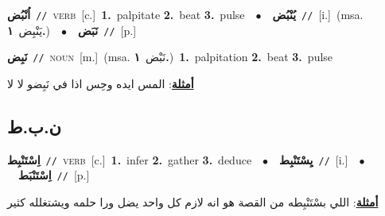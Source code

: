 \documentclass[10pt,a4paper,twoside]{article} %
\begin{document}
\begin{multicols}{2}
{{{{{\setlength\topsep{0pt}\textbf{\foreignlanguage{arabic}{اُنْبُض}}\ {\color{gray}\texttt{//}\color{black}}\ \textsc{verb}\ [c.]\ \textbf{1.}~palpitate  \textbf{2.}~beat  \textbf{3.}~pulse\ \ $\bullet$\ \ \setlength\topsep{0pt}\textbf{\foreignlanguage{arabic}{يُنْبُض}}\ {\color{gray}\texttt{//}\color{black}}\ [i.]\ \color{gray}(msa. \foreignlanguage{arabic}{يَنْبِض}~\foreignlanguage{arabic}{\textbf{١.}})\color{black}\ \ $\bullet$\ \ \setlength\topsep{0pt}\textbf{\foreignlanguage{arabic}{نَبَض}}\ {\color{gray}\texttt{//}\color{black}}\ [p.]\ 

{\setlength\topsep{0pt}\textbf{\foreignlanguage{arabic}{نَبِض}}\ {\color{gray}\texttt{//}\color{black}}\ \textsc{noun}\ [m.]\ \color{gray}(msa. \foreignlanguage{arabic}{نَبْض}~\foreignlanguage{arabic}{\textbf{١.}})\color{black}\ \textbf{1.}~palpitation  \textbf{2.}~beat  \textbf{3.}~pulse\  \begin{flushright}\color{gray}\foreignlanguage{arabic}{\textbf{\underline{\foreignlanguage{arabic}{أمثلة}}}: المس ايده وحِس اذا في نَبِضو لا لا}\end{flushright}\color{black}} \vspace{2mm}

\vspace{-3mm}
\subsection*{\color{blue}\foreignlanguage{arabic}{ن.ب.ط}\color{blue}{}} 

{\setlength\topsep{0pt}\textbf{\foreignlanguage{arabic}{اِسْتَنْبِط}}\ {\color{gray}\texttt{//}\color{black}}\ \textsc{verb}\ [c.]\ \textbf{1.}~infer  \textbf{2.}~gather  \textbf{3.}~deduce\ \ $\bullet$\ \ \setlength\topsep{0pt}\textbf{\foreignlanguage{arabic}{يِسْتَنْبِط}}\ {\color{gray}\texttt{//}\color{black}}\ [i.]\ \ $\bullet$\ \ \setlength\topsep{0pt}\textbf{\foreignlanguage{arabic}{اِسْتَنْبَط}}\ {\color{gray}\texttt{//}\color{black}}\ [p.]\  \begin{flushright}\color{gray}\foreignlanguage{arabic}{\textbf{\underline{\foreignlanguage{arabic}{أمثلة}}}: اللي بسْتَنْبِطه من القصة هو انه لازم كل واحد يضل ورا حلمه ويشتغلله كثير}\end{flushright}\color{black}} \vspace{2mm}

}}}}}
\end{multicols}
\end{document}
